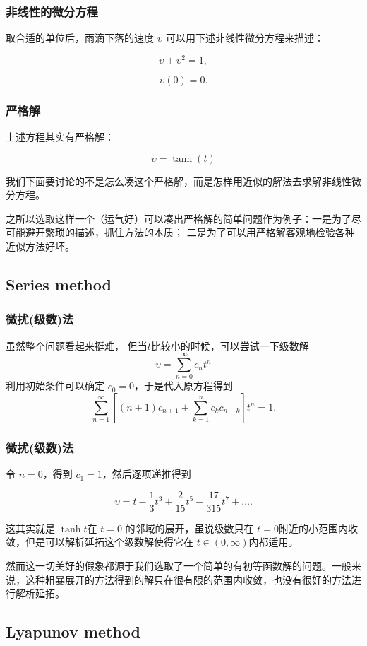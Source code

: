 \documentclass[CJK]{beamer}
\begin{document}
\begin{frame}
  \frametitle{非线性的微分方程}
  取合适的单位后，雨滴下落的速度 $\upsilon$ 可以用下述非线性微分方程来描述：

  $$ \dot \upsilon + \upsilon^2=1,$$

  $$\upsilon(0) = 0.$$
\end{frame}


\begin{frame}
  \frametitle{严格解}
  上述方程其实有严格解：

  $$ \upsilon = \tanh(t) $$


  我们下面要讨论的不是怎么凑这个严格解，而是怎样用近似的解法去求解非线性微分方程。
  
  之所以选取这样一个（运气好）可以凑出严格解的简单问题作为例子：一是为了尽可能避开繁琐的描述，抓住方法的本质； 二是为了可以用严格解客观地检验各种近似方法好坏。
  
\end{frame}

\subsection{Series method}

\begin{frame}
  \frametitle{微扰(级数)法}
  虽然整个问题看起来挺难， 但当$t$比较小的时候，可以尝试一下级数解
  $$ \upsilon =\sum_{n=0}^\infty c_n t^n $$
  利用初始条件可以确定 $c_0=0$，于是代入原方程得到
  $$ \sum_{n=1}^\infty \left[(n+1)c_{n+1}+\sum_{k=1}^nc_kc_{n-k}\right] t^n = 1.$$
  
\end{frame}  

\begin{frame}
  \frametitle{微扰(级数)法}
  令 $n=0$，得到 $c_1=1$，然后逐项递推得到

  $$ \upsilon = t - \frac{1}{3}t^3+\frac{2}{15}t^5 - \frac{17}{315}t^7+\ldots.$$

  这其实就是 $\tanh t$在 $t=0$ 的邻域的展开，虽说级数只在 $t=0$附近的小范围内收敛，但是可以解析延拓这个级数解使得它在 $t\in(0,\infty)$内都适用。

  \skipline
  
  然而这一切美好的假象都源于我们选取了一个简单的有初等函数解的问题。{\blue 一般来说，这种粗暴展开的方法得到的解只在很有限的范围内收敛，也没有很好的方法进行解析延拓。} 
\end{frame}  

\subsection{Lyapunov method}
\end{document}
